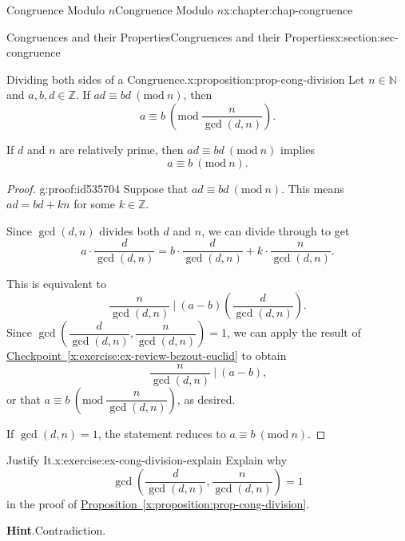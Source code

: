 \documentclass[oneside,10pt,]{book}
\newcommand{\blocktitlefont}{\relax}
\newcommand{\xreffont}{\relax}
\numberwithin{equation}{section}
\newcommand{\Mod}[1]{\ \left(\mathrm{mod}\ #1\right)}
\begin{document}
\begin{chapterptx}{Congruence Modulo \(n\)}{}{Congruence Modulo \(n\)}{}{}{x:chapter:chap-congruence}
\begin{sectionptx}{Congruences and their Properties}{}{Congruences and their Properties}{}{}{x:section:sec-congruence}
\begin{proposition}{Dividing both sides of a Congruence.}{}{x:proposition:prop-cong-division}%
Let \(n \in \mathbb{N}\) and \(a,b,d \in \mathbb{Z}\). If \(ad \equiv bd \Mod{n}\), then%
\begin{equation*}
a \equiv b \Mod{\dfrac{n}{\gcd(d,n)}}\text{.}
\end{equation*}
%
\par
If \(d\) and \(n\) are relatively prime, then \(ad \equiv bd \Mod{n}\) implies%
\begin{equation*}
a \equiv b \Mod{n}\text{.}
\end{equation*}
%
\end{proposition}
\begin{proof}{}{g:proof:id535704}
Suppose that \(ad \equiv bd \Mod{n}\). This means \(ad = bd + kn\) for some \(k \in \mathbb{Z}\).%
\par
Since \(\gcd(d,n)\) divides both \(d\) and \(n\), we can divide through to get%
\begin{equation*}
a\cdot \dfrac{d}{\gcd(d,n)} = b\cdot \dfrac{d}{\gcd(d,n)} + k \cdot\dfrac{n}{\gcd(d,n)}\text{.}
\end{equation*}
%
\par
This is equivalent to%
\begin{equation*}
\dfrac{n}{\gcd(d,n)} \ \Biggl\vert \ (a-b)\left(\dfrac{d}{\gcd(d,n)}\right)\text{.}
\end{equation*}
Since \(\gcd\left(\dfrac{d}{\gcd(d,n)},\dfrac{n}{\gcd(d,n)}\right) = 1\), we can apply the result of \hyperref[x:exercise:ex-review-bezout-euclid]{Checkpoint~{\xreffont\ref{x:exercise:ex-review-bezout-euclid}}} to obtain%
\begin{equation*}
\dfrac{n}{\gcd(d,n)} \ \Biggl\vert \ (a-b)\text{,}
\end{equation*}
or that \(a \equiv b \Mod{\dfrac{n}{\gcd(d,n)}}\), as desired.%
\par
If \(\gcd(d,n) = 1\), the statement reduces to \(a \equiv b \Mod{n}\).%
\end{proof}
\begin{inlineexercise}{Justify It.}{x:exercise:ex-cong-division-explain}%
Explain why%
\begin{equation*}
\gcd\left(\dfrac{d}{\gcd(d,n)},\dfrac{n}{\gcd(d,n)}\right) = 1
\end{equation*}
in the proof of \hyperref[x:proposition:prop-cong-division]{Proposition~{\xreffont\ref{x:proposition:prop-cong-division}}}.%
\par\smallskip%
\noindent\textbf{\blocktitlefont Hint}.\hypertarget{g:hint:id535769}{}\quad{}Contradiction.%

\end{inlineexercise}
\end{sectionptx}
\end{chapterptx}
\end{document}
